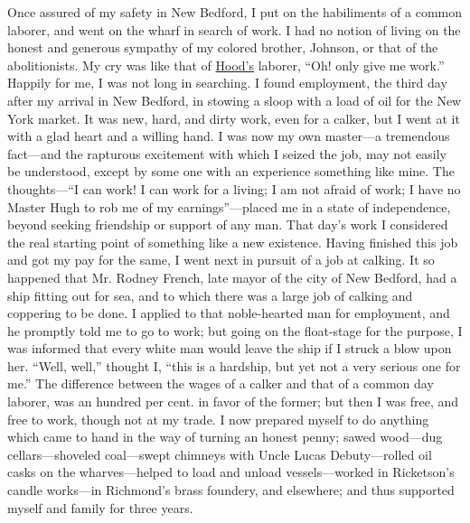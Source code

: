 Once assured of my safety in New Bedford, I put on the habiliments of a
common laborer, and went on the wharf in search of work. I had no notion
of living on the honest and generous sympathy of my colored brother,
Johnson, or that of the abolitionists. My cry was like that of
\href{/wiki/Author:Thomas_Hood}{Hood's} laborer, ``Oh! only give me
work.'' Happily for me, I was not long in searching. I found employment,
the third day after my arrival in New Bedford, in stowing a sloop with a
load of oil for the New York market. It was new, hard, and dirty work,
even for a calker, but I went {\protect\hypertarget{349}{}{}}at it with
a glad heart and a willing hand. I was now my own master---a tremendous
fact---and the rapturous excitement with which I seized the job, may not
easily be understood, except by some one with an experience something
like mine. The thoughts---``I can work! I can work for a living; I am
not afraid of work; I have no Master Hugh to rob me of my
earnings''---placed me in a state of independence, beyond seeking
friendship or support of any man. That day's work I considered the real
starting point of something like a new existence. Having finished this
job and got my pay for the same, I went next in pursuit of a job at
calking. It so happened that Mr. Rodney French, late mayor of the city
of New Bedford, had a ship fitting out for sea, and to which there was a
large job of calking and coppering to be done. I applied to that
noble-hearted man for employment, and he promptly told me to go to work;
but going on the float-stage for the purpose, I was informed that every
white man would leave the ship if I struck a blow upon her. ``Well,
well,'' thought I, ``this is a hardship, but yet not a very serious one
for me.'' The difference between the wages of a calker and that of a
common day laborer, was an hundred per cent. in favor of the former; but
then I was free, and free to work, though not at my trade. I now
prepared myself to do anything which came to hand in the way of turning
an honest penny; sawed wood---dug cellars---shoveled coal---swept
chimneys with Uncle Lucas Debuty---rolled oil casks on the
wharves---helped to load and unload vessels---worked in Ricketson's
candle {\protect\hypertarget{350}{}{}}works---in Richmond's brass
foundery, and elsewhere; and thus supported myself and family for three
years.

